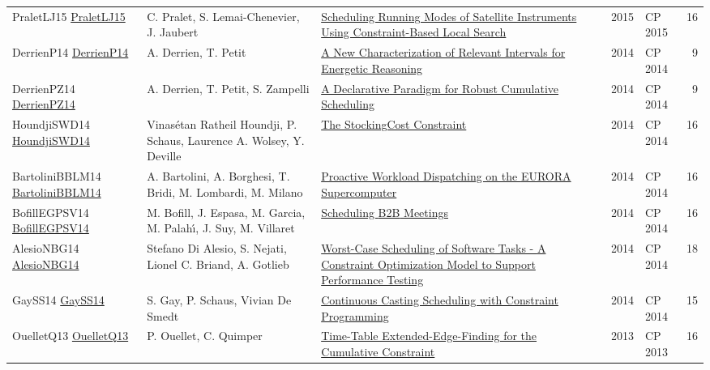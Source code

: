 {\begin{longtable}{p{3cm}p{6cm}p{7cm}rrrp{3cm}r}
PraletLJ15 \href{https://doi.org/10.1007/978-3-319-23219-5\_48}{PraletLJ15} & C. Pralet, S. Lemai{-}Chenevier, J. Jaubert & \href{papers/PraletLJ15.pdf}{Scheduling Running Modes of Satellite Instruments Using Constraint-Based Local Search} &  & \cite{PraletLJ15} & 2015 & CP 2015 & 16\\
DerrienP14 \href{https://doi.org/10.1007/978-3-319-10428-7\_22}{DerrienP14} & A. Derrien, T. Petit & \href{papers/DerrienP14.pdf}{A New Characterization of Relevant Intervals for Energetic Reasoning} &  & \cite{DerrienP14} & 2014 & CP 2014 & 9\\
DerrienPZ14 \href{https://doi.org/10.1007/978-3-319-10428-7\_23}{DerrienPZ14} & A. Derrien, T. Petit, S. Zampelli & \href{papers/DerrienPZ14.pdf}{A Declarative Paradigm for Robust Cumulative Scheduling} &  & \cite{DerrienPZ14} & 2014 & CP 2014 & 9\\
HoundjiSWD14 \href{https://doi.org/10.1007/978-3-319-10428-7\_29}{HoundjiSWD14} & Vinas{\'{e}}tan Ratheil Houndji, P. Schaus, Laurence A. Wolsey, Y. Deville & \href{papers/HoundjiSWD14.pdf}{The StockingCost Constraint} &  & \cite{HoundjiSWD14} & 2014 & CP 2014 & 16\\
BartoliniBBLM14 \href{https://doi.org/10.1007/978-3-319-10428-7\_55}{BartoliniBBLM14} & A. Bartolini, A. Borghesi, T. Bridi, M. Lombardi, M. Milano & \href{papers/BartoliniBBLM14.pdf}{Proactive Workload Dispatching on the {EURORA} Supercomputer} &  & \cite{BartoliniBBLM14} & 2014 & CP 2014 & 16\\
BofillEGPSV14 \href{https://doi.org/10.1007/978-3-319-10428-7\_56}{BofillEGPSV14} & M. Bofill, J. Espasa, M. Garcia, M. Palah{\'{\i}}, J. Suy, M. Villaret & \href{papers/BofillEGPSV14.pdf}{Scheduling {B2B} Meetings} &  & \cite{BofillEGPSV14} & 2014 & CP 2014 & 16\\
AlesioNBG14 \href{https://doi.org/10.1007/978-3-319-10428-7\_58}{AlesioNBG14} & Stefano {Di Alesio}, S. Nejati, Lionel C. Briand, A. Gotlieb & \href{papers/AlesioNBG14.pdf}{Worst-Case Scheduling of Software Tasks - {A} Constraint Optimization Model to Support Performance Testing} &  & \cite{AlesioNBG14} & 2014 & CP 2014 & 18\\
GaySS14 \href{https://doi.org/10.1007/978-3-319-10428-7\_59}{GaySS14} & S. Gay, P. Schaus, Vivian De Smedt & \href{papers/GaySS14.pdf}{Continuous Casting Scheduling with Constraint Programming} &  & \cite{GaySS14} & 2014 & CP 2014 & 15\\
OuelletQ13 \href{https://doi.org/10.1007/978-3-642-40627-0\_42}{OuelletQ13} & P. Ouellet, C. Quimper & \href{papers/OuelletQ13.pdf}{Time-Table Extended-Edge-Finding for the Cumulative Constraint} &  & \cite{OuelletQ13} & 2013 & CP 2013 & 16\\

\end{longtable}}

